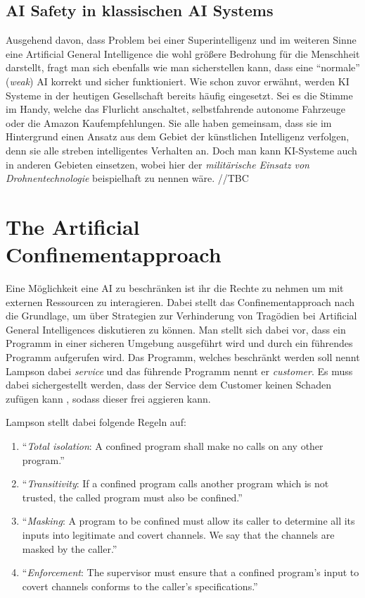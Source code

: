         \subsection{AI Safety in klassischen AI Systems}

        Ausgehend davon, dass Problem bei einer Superintelligenz und im weiteren Sinne eine Artificial General
        Intelligence die wohl größere Bedrohung für die Menschheit darstellt, fragt man sich ebenfalls wie man
        sicherstellen kann, dass eine ``normale'' (\textit{weak}) AI korrekt und sicher funktioniert. Wie schon
        zuvor erwähnt, werden KI Systeme in der heutigen Gesellschaft bereits häufig eingesetzt. Sei es die
        Stimme im Handy, welche das Flurlicht anschaltet, selbstfahrende autonome Fahrzeuge oder die Amazon
        Kaufempfehlungen. Sie alle haben gemeinsam, dass sie im Hintergrund einen Ansatz aus dem Gebiet der künstlichen
        Intelligenz verfolgen, denn sie alle streben intelligentes Verhalten an. Doch man kann KI-Systeme auch in
        anderen Gebieten einsetzen, wobei hier der \textit{militärische Einsatz von Drohnentechnologie} beispielhaft
        zu nennen wäre. \cite[p. 251]{Stulpe2018}//TBC

    \section{The Artificial Confinementapproach}

        Eine Möglichkeit eine AI zu beschränken ist ihr die Rechte zu nehmen um mit externen Ressourcen zu interagieren.
        Dabei stellt das Confinementapproach nach \citep{lampson1973note} die Grundlage, um über Strategien zur Verhinderung
        von Tragödien bei Artificial General Intelligences diskutieren zu können. Man stellt sich dabei vor, dass ein Programm
        in einer sicheren Umgebung ausgeführt wird und durch ein führendes Programm aufgerufen wird. Das Programm, welches
        beschränkt werden soll nennt Lampson dabei \textit{service} und das führende Programm nennt er \textit{customer}.
        Es muss dabei sichergestellt werden, dass der Service dem Customer keinen Schaden zufügen kann \cite{lampson1973note},
        sodass dieser frei aggieren kann.

        Lampson stellt dabei folgende Regeln auf:
        \begin{enumerate}
            \item ``\textit{Total isolation}: A confined program shall make no calls on any other program.''
            \item ``\textit{Transitivity}: If a confined program calls another program which is not trusted, the
            called program must also be confined.''
            \item ``\textit{Masking}: A program to be confined must allow its caller to determine all its inputs into
            legitimate and covert channels. We say that the channels are masked by the caller.''
            \item ``\textit{Enforcement}: The supervisor must ensure that a confined program's input to covert
            channels conforms to the caller's specifications.''
        \end{enumerate}

